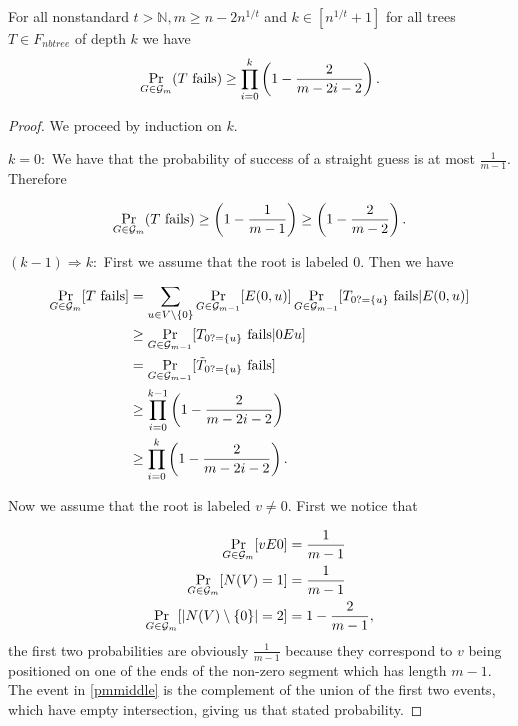 \begin{lemm}
For all nonstandard $t>\mathbb{N},m\geq n-2n^{1/t}$ and $k\in [n^{1/t}+1]$ for all trees $T\in F_{nbtree}$ of depth $k$ we have
\[
\Pr_{G\in\mathcal{G}_m}(\text{$T$ fails})\geq \prod_{i=0}^k\left (1-\frac{2}{m-2i-2}\right ).
\]
\end{lemm}
\begin{proof}
We proceed by induction on $k$. 

$k=0:$ We have that the probability of success of a straight guess is at most $\frac{1}{m-1}$. Therefore

\begin{align}
\Pr_{G\in\mathcal{G}_m}(\text{$T$ fails})\geq \left (1-\frac{1}{m-1}\right ) \geq \left(1-\frac{2}{m-2}\right).
\end{align}

$(k-1) \Rightarrow k:$ First we assume that the root is labeled $0$. Then we have 

\begin{align}
\Pr_{G\in\mathcal{G}_m}[\text{$T$ fails}]&=\sum_{u\in V\setminus\{0\}}\Pr_{G\in\mathcal{G}_{m-1}}[E(0,u)]\Pr_{G\in\mathcal{G}_{m-1}}[T_{0?=\{u\}}\text{ fails}|E(0,u)]\\
&\geq \Pr_{G\in\mathcal{G}_{m-1}}[T_{0?=\{u\}}\text{ fails}|0Eu]\\
&= \Pr_{G\in\mathcal{G}_{m-1}}[\tilde T_{0?=\{u\}}\text{ fails}]\\
&\geq \prod_{i=0}^{k-1}\left(1-\frac{2}{m-2i-2}\right)\\
&\geq \prod_{i=0}^{k}\left(1-\frac{2}{m-2i-2}\right).
\end{align}

Now we assume that the root is labeled $v\not= 0$. First we notice that

\begin{align}
\Pr_{G\in\mathcal{G}_m}[vE0]&=\frac{1}{m-1}\\
\Pr_{G\in\mathcal{G}_m}[N(V)=1]&=\frac{1}{m-1}\\
\Pr_{G\in\mathcal{G}_m}[\left|{N(V)\setminus\{0\}}\right|=2]&=1-\frac{2}{m-1},\label{pmmiddle}
\end{align}
the first two probabilities are obviously $\frac{1}{m-1}$ because they correspond to $v$ being positioned on one of the ends of the non-zero segment which has length $m-1$. The event in \eqref{pmmiddle} is the complement of the union of the first two events, which have empty intersection, giving us that stated probability.


\end{proof}
